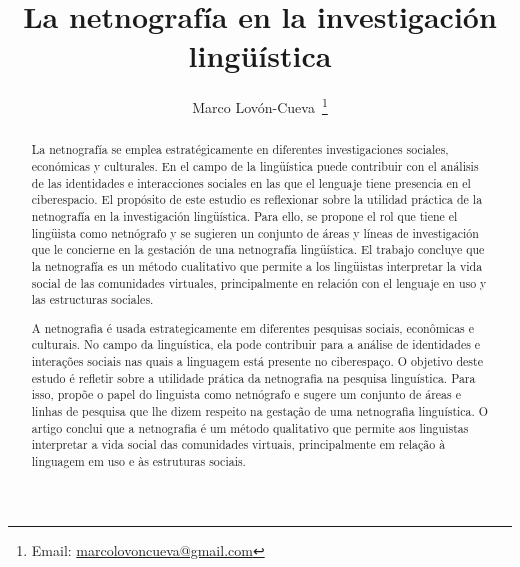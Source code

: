 \documentclass[spanish]{textolivre}
\title{La netnografía en la investigación lingüística}
\author[1]{Marco Lovón-Cueva~\orcid{0000-0002-9182-6072}\thanks{Email: \href{mailto:marcolovoncueva@gmail.com}{marcolovoncueva@gmail.com}}}
\affil[1]{Universidad Nacional Mayor de San Marcos, Lima, Perú.}
\begin{document}
\maketitle
\begin{polyabstract}

\begin{spanish}
\begin{abstract}
 La netnografía se emplea estratégicamente en diferentes investigaciones sociales, económicas y culturales. En el campo de la lingüística puede contribuir con el análisis de las identidades e interacciones sociales en las que el lenguaje tiene presencia en el ciberespacio. El propósito de este estudio es reflexionar sobre la utilidad práctica de la netnografía en la investigación lingüística. Para ello, se propone el rol que tiene el lingüista como netnógrafo y se sugieren un conjunto de áreas y líneas de investigación que le concierne en la gestación de una netnografía lingüística. El trabajo concluye que la netnografía es un método cualitativo que permite a los lingüistas interpretar la vida social de las comunidades virtuales, principalmente en relación con el lenguaje en uso y las estructuras sociales.  

\end{abstract}
\end{spanish}

\begin{portuguese}
\begin{abstract}
    A netnografia é usada estrategicamente em diferentes pesquisas sociais, econômicas e culturais. No campo da linguística, ela pode contribuir para a análise de identidades e interações sociais nas quais a linguagem está presente no ciberespaço. O objetivo deste estudo é refletir sobre a utilidade prática da netnografia na pesquisa linguística. Para isso, propõe o papel do linguista como netnógrafo e sugere um conjunto de áreas e linhas de pesquisa que lhe dizem respeito na gestação de uma netnografia linguística. O artigo conclui que a netnografia é um método qualitativo que permite aos linguistas interpretar a vida social das comunidades virtuais, principalmente em relação à linguagem em uso e às estruturas sociais.      
\end{abstract}
\end{portuguese}


\end{polyabstract}
\end{document}
